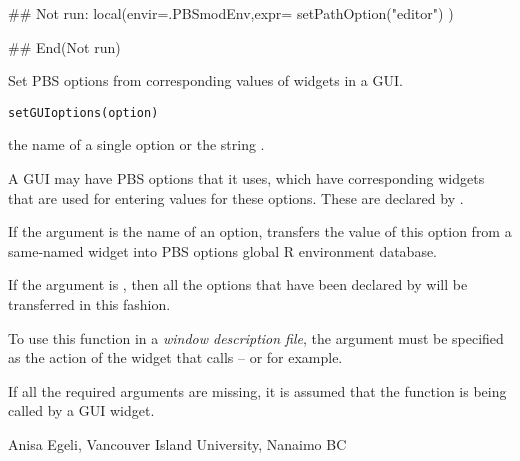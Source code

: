 \documentclass[letterpaper]{book}
\begin{document}
\begin{Examples}
\begin{ExampleCode}
## Not run: 
local(envir=.PBSmodEnv,expr={
  setPathOption("editor")
})

## End(Not run)
\end{ExampleCode}
\end{Examples}
%
\begin{Description}\relax
Set PBS options from corresponding values of widgets in a GUI.
\end{Description}
%
\begin{Usage}
\begin{verbatim}
setGUIoptions(option)
\end{verbatim}
\end{Usage}
%
\begin{Arguments}
\begin{ldescription}
\item[\code{option}] the name of a single option or the string .
\end{ldescription}
\end{Arguments}
%
\begin{Details}\relax
A GUI may have PBS options that it uses, which have corresponding widgets that
are used for entering values for these options. These are declared by
.

If the  argument is the name of an option, 
 transfers the value of this option from a 
same-named widget into PBS options global R environment database.

If the  argument is , then all the 
options that have been declared by  
will be transferred in this fashion.

To use this function in a \emph{window description file}, the 
 argument must be specified as the action of the 
widget that calls  --  
or  for example.
\end{Details}
%
\begin{Note}\relax
If all the required arguments are missing, it is assumed that 
the function is being called by a GUI widget.
\end{Note}
%
\begin{Author}\relax
Anisa Egeli, Vancouver Island University, Nanaimo BC
\end{Author}
\end{document}
